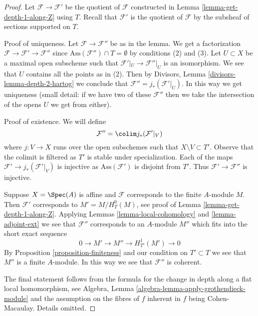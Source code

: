 \begin{proof}
Let $\mathcal{F} \to \mathcal{F}'$ be the quotient of $\mathcal{F}$
constructed in Lemma \ref{lemma-get-depth-1-along-Z} using $T$.
Recall that $\mathcal{F}'$ is the quotient of $\mathcal{F}$
by the subsheaf of sections supported on $T$.

\medskip\noindent
Proof of uniqueness. Let $\mathcal{F} \to \mathcal{F}''$
be as in the lemma. We get a factorization
$\mathcal{F} \to \mathcal{F}' \to \mathcal{F}''$
since $\text{Ass}(\mathcal{F}'') \cap T = \emptyset$
by conditions (2) and (3). Let $U \subset X$ be a maximal open
subscheme such that $\mathcal{F}'|_U \to \mathcal{F}''|_U$
is an isomorphism. We see that $U$ contains all the points
as in (2). Then by Divisors, Lemma \ref{divisors-lemma-depth-2-hartog}
we conclude that $\mathcal{F}'' = j_*(\mathcal{F}'|_U)$.
In this way we get uniqueness (small detail: if we have two
of these $\mathcal{F}''$ then we take the intersection of the opens $U$
we get from either).

\medskip\noindent
Proof of existence. We will define
$$
\mathcal{F}'' = \colim j_*(\mathcal{F}'|_V)
$$
where $j : V \to X$ runs over the open subschemes such that
$X \setminus V \subset T'$. Observe that the colimit is filtered
as $T'$ is stable under specialization. Each of the
maps $\mathcal{F}' \to j_*(\mathcal{F}'|_V)$ is injective
as $\text{Ass}(\mathcal{F}')$ is disjoint from $T'$.
Thus $\mathcal{F}' \to \mathcal{F}''$ is injective.

\medskip\noindent
Suppose $X = \Spec(A)$ is affine and $\mathcal{F}$
corresponds to the finite $A$-module $M$. Then $\mathcal{F}'$
corresponds to $M' = M / H^0_T(M)$, see proof of
Lemma \ref{lemma-get-depth-1-along-Z}. Applying
Lemmas \ref{lemma-local-cohomology} and \ref{lemma-adjoint-ext}
we see that $\mathcal{F}''$ corresponds to an $A$-module
$M''$ which fits into the short exact sequence
$$
0 \to M' \to M'' \to H^1_{T'}(M') \to 0
$$
By Proposition \ref{proposition-finiteness} and our condition
on $T' \subset T$ we see that $M''$ is a finite $A$-module. In this way
we see that $\mathcal{F}''$ is coherent.

\medskip\noindent
The final statement follows from the formula for the change in
depth along a flat local homomorphism, see
Algebra, Lemma \ref{algebra-lemma-apply-grothendieck-module}
and the assumption on the fibres of $f$ inherent in $f$ being
Cohen-Macaulay. Details omitted.
\end{proof}






